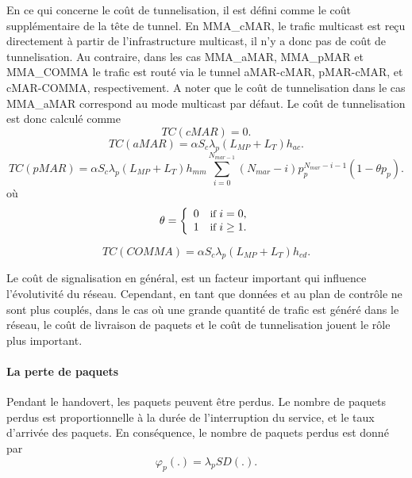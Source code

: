 En ce qui concerne le coût de tunnelisation, il est défini comme le coût supplémentaire de la tête de tunnel. En MMA\_cMAR, le trafic multicast est reçu directement à partir de l'infrastructure multicast, il n'y a donc pas de coût de tunnelisation. Au contraire, dans les cas MMA\_aMAR, MMA\_pMAR et MMA\_COMMA le trafic est routé via le tunnel aMAR-cMAR, pMAR-cMAR, et cMAR-COMMA, respectivement. A noter que le coût de tunnelisation dans le cas MMA\_aMAR correspond au mode multicast par défaut. Le coût de tunnelisation est donc calculé comme \\
\begin{equation}
TC(cMAR) = 0. 
\end{equation}
\begin{equation}
TC(aMAR) = \alpha  S_{c} \lambda_{p} (L_{MP} + L_{T}) h_{ac}. 
\end{equation}
\begin{equation}
TC(pMAR)=  \alpha  S_{c} \lambda_{p} (L_{MP} + L_{T}) h_{mm}  \sum_{i=0}^{N_{mar-1}} (N_{mar}-i)p_{p}^{N_{mar}-i-1} (1-\theta p_{p}).
\end{equation}
où  
\[\theta  = \left\{ 
 \begin{array}{l l}
   0 \quad \small \text{if } i =0,  \\
    1  \quad \small \text{if } i \geq 1. 
 \end{array} \right.\] 

\begin{equation}
TC(COMMA) = \alpha  S_{c} \lambda_{p} (L_{MP} + L_{T}) h_{cd}. 
\end{equation}

Le coût de signalisation en général, est un facteur important qui influence l'évolutivité du réseau. Cependant, en tant que données et au plan de contrôle ne sont plus couplés, dans le cas où une grande quantité de trafic est généré dans le réseau, le coût de livraison de paquets et le coût de tunnelisation jouent le rôle plus important.
 
\paragraph{La perte de paquets}
Pendant le handovert, les paquets peuvent être perdus. Le nombre de paquets perdus est proportionnelle à la durée de l'interruption du service, et le taux d'arrivée des paquets. En conséquence, le nombre de paquets perdus est donné par \\
\begin{equation}
\varphi_{p}(.)= \lambda_{p} SD(.).
\end{equation}


